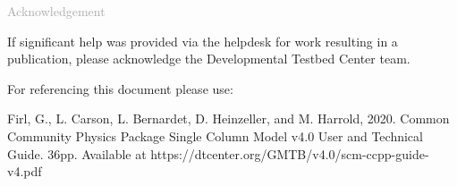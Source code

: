 \begin{titlepage}
\vspace*{0.5cm}
\noindent

\begin{flushleft}
\textcolor{darkgray}{\LARGE Acknowledgement}
\vspace*{1cm}\par

If significant help was provided via the helpdesk for work resulting in a publication, please acknowledge the Developmental Testbed Center team.\\
\vspace*{1cm}\par
For referencing this document please use:\\
\vspace*{1cm}\par
Firl, G., L. Carson, L. Bernardet, D. Heinzeller, and M. Harrold, 2020. Common Community Physics Package Single Column Model v4.0 User and Technical Guide. 36pp. Available at https://dtcenter.org/GMTB/v4.0/scm-ccpp-guide-v4.pdf

\end{flushleft}
\end{titlepage}
\pagebreak{}
